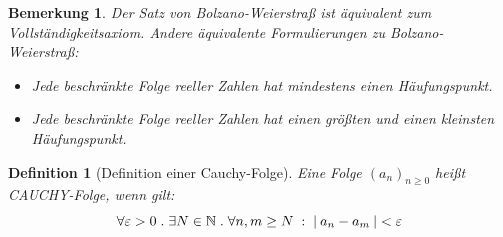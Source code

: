 \documentclass[a4paper,titlepage,oneside]{article}
\def\N{\ensuremath{\mathbb{N}} }
\renewcommand{\epsilon}{\ensuremath{\varepsilon} }
\def\sp{\hspace{0,1cm}}
\def\spdot{\sp.\sp}
\def\spcolon{\sp:\sp}
\newcommand{\abs}[1]{\ensuremath{\left|\:#1\:\right|}}
\theoremstyle{thmstyle}
\newtheorem{defi}[satz]{Definition}
\newtheorem{bem}[satz]{Bemerkung}
\theoremstyle{subthmstyle}
\begin{document}
\begin{bem}
Der Satz von Bolzano-Weierstraß ist äquivalent zum Vollständigkeitsaxiom. Andere äquivalente Formulierungen zu Bolzano-Weierstraß:
\begin{itemize}
\item Jede beschränkte Folge reeller Zahlen hat mindestens einen Häufungspunkt.
\item Jede beschränkte Folge reeller Zahlen hat einen größten und einen kleinsten Häufungspunkt.
\end{itemize}
\end{bem}

\begin{defi}[Definition einer Cauchy-Folge]
Eine Folge \((a_n)_{n \ge 0}\) heißt CAUCHY-Folge, wenn gilt:
\[\forall \epsilon > 0 \spdot \exists N \in \N \spdot \forall n, m \ge N \spcolon \abs{a_n - a_m} < \epsilon\]
\end{defi}
\end{document}
